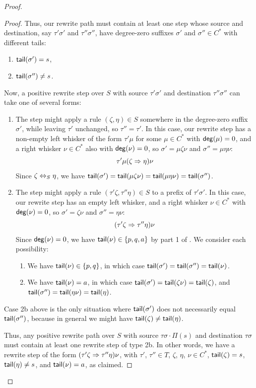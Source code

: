 \documentclass[../generics]{subfiles}
\begin{document}
\begin{proof}
\begin{proof}
Thus, our rewrite path must contain at least one step whose source and destination, say $\tau' \sigma'$ and $\tau'' \sigma''$, have degree-zero suffixes $\sigma'$ and $\sigma'' \in C^*$ with different tails:
\begin{enumerate}
\item $\mathsf{tail}(\sigma') = s$,
\item $\mathsf{tail}(\sigma'') \neq s$.
\end{enumerate}
Now, a positive rewrite step over $S$ with source $\tau' \sigma'$ and destination $\tau'' \sigma''$ can take one of several forms:
\begin{enumerate}
\item The step might apply a rule $(\zeta, \eta) \in S$ somewhere in the degree-zero suffix $\sigma'$, while leaving $\tau'$ unchanged, so $\tau'' = \tau'$. In this case, our rewrite step has a non-empty left whisker of the form $\tau' \mu$ for some $\mu \in C^*$ with $\mathsf{deg}(\mu)=0$, and a right whisker $\nu \in C^*$ also with $\mathsf{deg}(\nu)=0$, so $\sigma' = \mu \zeta \nu$ and $\sigma'' = \mu \eta \nu$:
\[
\tau' \mu (\zeta \Rightarrow \eta) \nu
\]
Since $\zeta \Leftrightarrow_S \eta$, we have $\mathsf{tail}(\sigma') = \mathsf{tail}(\mu \zeta \nu) = \mathsf{tail}(\mu \eta \nu) = \mathsf{tail}(\sigma'')$.

\item The step might apply a rule $(\tau' \zeta, \tau'' \eta) \in S$ to a prefix of $\tau' \sigma'$. In this case, our rewrite step has an empty left whisker, and a right whisker $\nu \in C^*$ with $\mathsf{deg}(\nu)=0$, so $\sigma' = \zeta \nu$ and $\sigma'' = \eta \nu$:
\[
(\tau' \zeta \Rightarrow \tau'' \eta) \nu
\]
Since $\mathsf{deg}(\nu)=0$, we have $\mathsf{tail}(\nu) \in \{p,q,a\}$ by part 1 of . We consider each possibility:
\begin{enumerate}
\item We have $\mathsf{tail}(\nu) \in \{p,q\}$, in which case $\mathsf{tail}(\sigma') = \mathsf{tail}(\sigma'') = \mathsf{tail}(\nu)$.
\item We have $\mathsf{tail}(\nu) = a$, in which case $\mathsf{tail}(\sigma') = \mathsf{tail}(\zeta\nu) = \mathsf{tail}(\zeta)$, and $\mathsf{tail}(\sigma'') = \mathsf{tail}(\eta\nu) = \mathsf{tail}(\eta)$.
\end{enumerate}
\end{enumerate}

Case 2b above is the only situation where  $\mathsf{tail}(\sigma')$ does not necessarily equal $\mathsf{tail}(\sigma'')$, because in general we might have $\mathsf{tail}(\zeta) \neq \mathsf{tail}(\eta)$.

Thus, any positive rewrite path over $S$ with source $\tau \sigma \cdot \Pi(s)$ and destination $\tau \sigma$ must contain at least one rewrite step of type 2b. In other words, we have a rewrite step of the form $( \tau' \zeta \Rightarrow \tau'' \eta ) \nu$, with $\tau'$, $\tau'' \in T$, $\zeta$, $\eta$, $\nu \in C^*$,  $\mathsf{tail}(\zeta) = s$, $\mathsf{tail}(\eta) \neq s$, and $\mathsf{tail}(\nu) = a$, as claimed.
\end{proof}


\end{proof}
\end{document}

